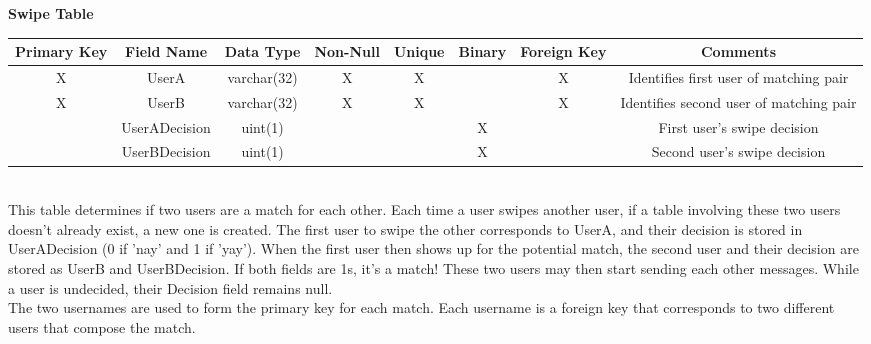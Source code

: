 \documentclass{article}
\begin{document}
\begin{enumerate}
        \textbf{Swipe Table}\\
        \begin{adjustbox}{width=1.2\textwidth}
            \begin{tabular}{|c|c|c|c|c|c|c|c|}
                \hline
                Primary Key & Field Name & Data Type & Non-Null & Unique & Binary & Foreign Key & Comments \\ \hline
                X & UserA & varchar(32) & X & X &  & X & Identifies first user of matching pair\\ \hline
                X & UserB & varchar(32) & X & X &  & X & Identifies second user of matching pair\\ \hline
                 & UserADecision & uint(1) &  &  & X &  & First user's swipe decision\\ \hline
                 & UserBDecision & uint(1) &  &  & X &  & Second user's swipe decision\\ \hline
            \end{tabular}
        \end{adjustbox}\\
        This table determines if two users are a match for each other. Each time a user swipes another user, if a table involving these two users doesn't already exist, a new one is created. The first user to swipe the other corresponds to UserA, and their decision is stored in UserADecision (0 if 'nay' and 1 if 'yay'). When the first user then shows up for the potential match, the second user and their decision are stored as UserB and UserBDecision. If both fields are 1s, it's a match! These two users may then start sending each other messages. While a user is undecided, their Decision field remains null.\\
        The two usernames are used to form the primary key for each match. Each username is a foreign key that corresponds to two different users that compose the match.\\
        

\end{enumerate}
\end{document}
